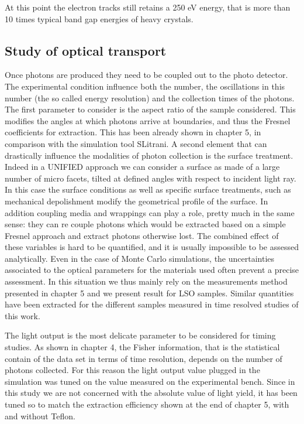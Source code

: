 At this point the electron tracks still retains a 250 eV energy, that is more than 10 times typical band gap energies of heavy crystals. 

\subsection{Study of optical transport}
Once photons are produced they need to be coupled out to the photo detector. The experimental condition influence both the number, the oscillations in this number (the so called energy resolution) and the collection times of the photons. 
The first parameter to consider is the aspect ratio of the sample considered. This modifies the angles at which photons arrive at boundaries, and thus the Fresnel coefficients for extraction. This has been already shown in chapter 5, in comparison with the simulation tool SLitrani.
A second element that can drastically influence the modalities of photon collection is the surface treatment. Indeed in a UNIFIED approach we can consider a surface as made of a large number of micro facets, tilted at defined angles with respect to incident light ray. In this case the surface conditions as well as specific surface treatments, such as mechanical depolishment modify the geometrical profile of the surface.
In addition coupling media and wrappings can play a role, pretty much in the same sense: they can re couple photons which would be extracted based on a simple Fresnel approach and extract photons otherwise lost.
The combined effect of these variables is hard to be quantified, and it is usually impossible to be assessed analytically. Even in the case of Monte Carlo simulations, the uncertainties associated to the optical parameters for the materials used often prevent a precise assessment. In this situation we thus mainly rely on the measurements method presented in chapter 5 and we present result for LSO samples. Similar quantities have been extracted for the different samples measured in time resolved studies of this work.

The light output is the most delicate parameter to be considered for timing studies. As shown in chapter 4, the Fisher information, that is the statistical contain of the data set in terms of time resolution, depends on the number of photons collected. For this reason the light output value plugged in the simulation was tuned on the value measured on the experimental bench. Since in this study we are not concerned with the absolute value of light yield, it has been tuned so to match the extraction efficiency shown at the end of chapter 5, with and without Teflon.

